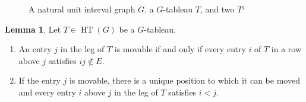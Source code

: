 \documentclass[10pt,a4paper]{amsart}
\theoremstyle{definition}
\newtheorem{lemma}[theorem]{Lemma}
\theoremstyle{remark}
\numberwithin{equation}{section}
\DeclareMathOperator{\HT}{HT}
\newlength\cellsize \setlength\cellsize{15\unitlength}
\newcommand\cellify[1]{\def\thearg{#1}\def\nothing{}%
\ifx\thearg\nothing
\vrule width0pt height\cellsize depth0pt\else
\hbox to 0pt{\usebox2\hss}\fi%
\vbox to 15\unitlength{
\vss
\hbox to 15\unitlength{\hss$#1$\hss}
\vss}}
\newcommand\tableau[1]{\vtop{\let\\=\cr
\setlength\baselineskip{-16000pt}
\setlength\lineskiplimit{16000pt}
\setlength\lineskip{0pt}
\halign{&\cellify{##}\cr#1\crcr}}}
\begin{document}
\begin{figure}
\begin{center}
\end{center}
\caption{\label{move} A natural unit interval graph $G$, a $G$-tableau $T$, and two $T^j$}
\end{figure}



\begin{lemma} \label{lem:legtoarm}
Let $T\in\HT(G)$ be a $G$-tableau. 

\begin{enumerate}
\item[(a)] An entry $j$ in the leg of $T$ is movable if and only if every entry $i$ of $T$ in a row above $j$ satisfies $ij\notin E$. 
\item[(b)] If the entry $j$ is movable, there is a unique position to which it can be moved and every entry $i$ above $j$ in the leg of $T$ satisfies $i<j$. 
\end{enumerate}

\end{lemma}
\end{document}

